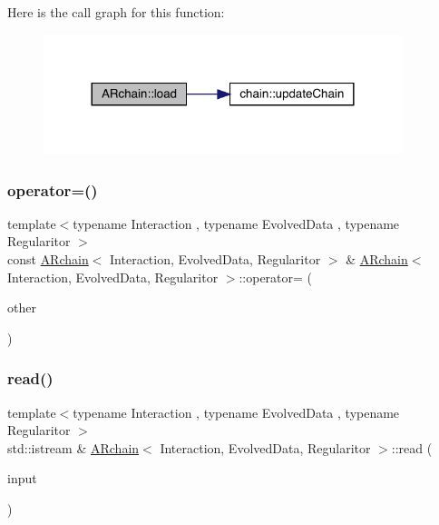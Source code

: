 Here is the call graph for this function\+:
\nopagebreak
\begin{figure}[H]
\begin{center}
\leavevmode
\includegraphics[width=296pt]{class_a_rchain_a7edf1240a094d55df222c816659dced0_cgraph}
\end{center}
\end{figure}
\mbox{\label{class_a_rchain_a7bcc783f99cad1e9113d2b505544aba1}} 
\subsubsection{\texorpdfstring{operator=()}{operator=()}}
{\footnotesize\ttfamily template$<$typename Interaction , typename Evolved\+Data , typename Regularitor $>$ \\
const \mbox{\hyperlink{class_a_rchain}{A\+Rchain}}$<$ Interaction, Evolved\+Data, Regularitor $>$ \& \mbox{\hyperlink{class_a_rchain}{A\+Rchain}}$<$ Interaction, Evolved\+Data, Regularitor $>$\+::operator= (\begin{DoxyParamCaption}\item[{const \mbox{\hyperlink{class_a_rchain}{A\+Rchain}}$<$ Interaction, Evolved\+Data, Regularitor $>$ \&}]{other }\end{DoxyParamCaption})}

\mbox{\label{class_a_rchain_a86bd89bacf59c9c3bb0594499db82e04}} 
\subsubsection{\texorpdfstring{read()}{read()}}
{\footnotesize\ttfamily template$<$typename Interaction , typename Evolved\+Data , typename Regularitor $>$ \\
std\+::istream \& \mbox{\hyperlink{class_a_rchain}{A\+Rchain}}$<$ Interaction, Evolved\+Data, Regularitor $>$\+::read (\begin{DoxyParamCaption}\item[{std\+::istream \&}]{input }\end{DoxyParamCaption})}

